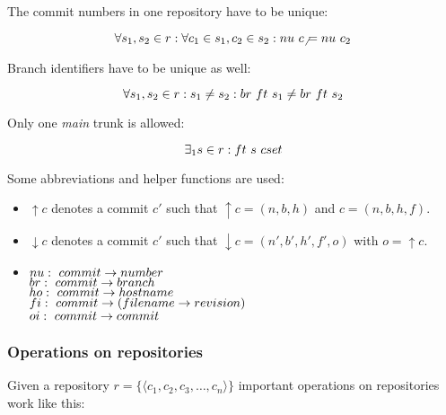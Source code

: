 \documentclass[fleqn, german, 10pt, a4paper]{article}
\begin{document}
The commit numbers in one repository have to be unique:

\begin{displaymath}
\forall s_1, s_2 \in r: \forall c_1 \in s_1, c_2 \in s_2: \mathnormal{nu}\ c_
\neq \mathnormal{nu}\ c_2
\end{displaymath}

Branch identifiers have to be unique as well:

\begin{displaymath}
\forall s_1, s_2 \in r: s_1 \neq s_2: \mathnormal{br}\ \mathnormal{ft}\ s_1
\neq \mathnormal{br}\ \mathnormal{ft}\ s_2
\end{displaymath}

Only one \emph{main} trunk is allowed:

\begin{displaymath}
\exists_1 s\in r : \mathnormal{ft}\ s \ \mathnormal{cset}
\end{displaymath}

Some abbreviations and helper functions are used:

\begin{itemize}
\item $\uparrow c$ denotes a commit $c'$ such that $\uparrow c = (n, b, h)$
and $c=(n, b, h, f)$.
\item $\downarrow c$ denotes a commit $c'$ such that $\downarrow
c = (n', b', h', f', o)$ with $o = \uparrow c$.
\item $\mathnormal{nu}:\ \mathnormal{commit} \rightarrow \mathnormal{number}$ \\
$\mathnormal{br}:\ \mathnormal{commit} \rightarrow \mathnormal{branch}$ \\
$\mathnormal{ho}:\ \mathnormal{commit} \rightarrow \mathnormal{hostname}$ \\
$\mathnormal{fi}:\ \mathnormal{commit} \rightarrow (\mathnormal{filename} \rightarrow \mathnormal{revision})$ \\
$\mathnormal{oi}:\ \mathnormal{commit} \rightarrow \mathnormal{commit}$
\end{itemize}

\subsubsection{Operations on repositories}

Given a repository $r = \{\langle c_1, c_2, c_3, \ldots, c_n\rangle\}$ 
important operations on repositories work like this:
\end{document}
